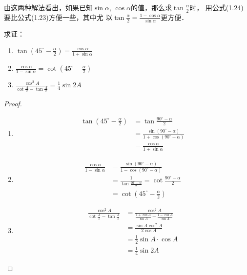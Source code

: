 由这两种解法看出，如果已知$\sin\alpha$, $\cos\alpha$的值，那么求$\tan\frac{\alpha}{2}$时，
用公式(1.24)要比公式(1.23)方便一些，其中尤
以$\tan\frac{\alpha}{2}=\frac{1-\cos\alpha}{\sin\alpha}$更方便．

\begin{example}
    求证：
\begin{multicols}{2}
    \begin{enumerate}
    \item $\tan\left(45^{\circ}-\frac{\alpha}{2}\right)=\frac{\cos\alpha}{1+\sin\alpha}$
    \item $\frac{\cos\alpha}{1-\sin\alpha}=\cot \left(45^{\circ}-\frac{\alpha}{2}\right)$
    \item $\frac{\cos^2 A}{\cot\frac{A}{2}-\tan\frac{A}{2}}=\frac{1}{4}\sin 2A$
\end{enumerate}
\end{multicols}
\end{example}

\begin{proof}
\begin{enumerate}
    \item \[\begin{split}
\tan\left(45^{\circ}-\frac{\alpha}{2}\right) &=\tan\frac{90^{\circ}-\alpha}{2}\\ 
&=\frac{\sin(90^{\circ}-\alpha)}{1+\cos(90^{\circ}-\alpha)}\\
&=\frac{\cos\alpha}{1+\sin\alpha}
    \end{split}\]

    \item \[\begin{split}
        \frac{\cos\alpha}{1-\sin\alpha}&= \frac{\sin(90^{\circ}-\alpha)}{1-\cos(90^{\circ}-\alpha)}\\
        &=\frac{1}{\tan\frac{90^{\circ}-\alpha}{2}}=\cot\frac{90^{\circ}-\alpha}{2}\\
&=\cot\left(45^{\circ}-\frac{\alpha}{2}\right)
    \end{split}\]

    \item \[\begin{split}
\frac{\cos^2 A}{\cot\frac{A}{2}-\tan\frac{A}{2}}&=\frac{\cos^2 A}{\frac{1+\cos A}{\sin A}-\frac{1-\cos A}{\sin A}}\\        
&=\frac{\sin A\cos^2 A}{2\cos A}\\
&=\frac{1}{2}\sin A\cdot \cos A\\
&=\frac{1}{4}\sin 2A
    \end{split}\]
\end{enumerate}    
\end{proof}

